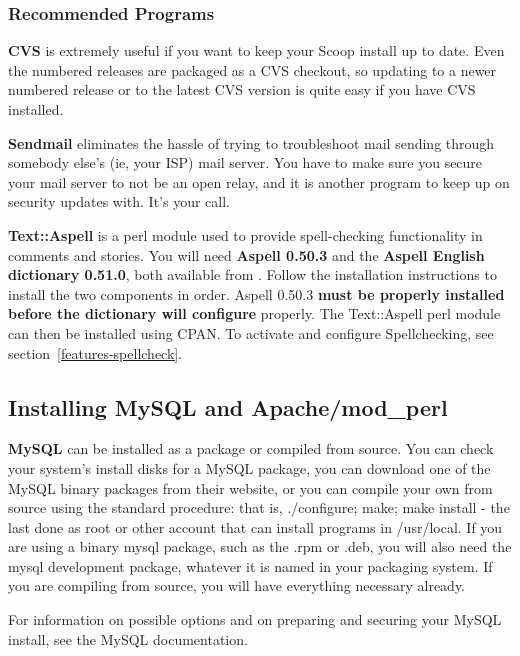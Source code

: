 \subsubsection{Recommended Programs}
\label{install-recommended-programs}

{\bf CVS} is extremely useful if you want to keep your Scoop install up to date.  Even the numbered releases are packaged as a CVS checkout, so updating to a newer numbered release or to the latest CVS version is quite easy if you have CVS installed.

{\bf Sendmail} eliminates the hassle of trying to troubleshoot mail sending through somebody else's (ie, your ISP) mail server.  You have to make sure you secure your mail server to not be an open relay, and it is another program to keep up on security updates with.  It's your call.

{\bf Text::Aspell} is a perl module used to provide spell-checking functionality in comments and stories.  You will need {\bf Aspell 0.50.3} and the {\bf Aspell English dictionary 0.51.0}, both available from .  Follow the installation instructions to install the two components in order.  Aspell 0.50.3 {\bf must be properly installed before the dictionary will configure} properly.  The Text::Aspell perl module can then be installed using CPAN.  To activate and configure Spellchecking, see section~\ref{features-spellcheck}.

\subsection{Installing MySQL and Apache/mod\_perl}
\label{install-apache-modperl}

{\bf MySQL} can be installed as a package or compiled from source.  You can check your system's install disks for a MySQL package, you can download one of the MySQL binary packages from their website, or you can compile your own from source using the standard procedure: that is, ./configure; make; make install - the last done as root or other account that can install programs in /usr/local.  If you are using a binary mysql package, such as the .rpm or .deb, you will also need the mysql development package, whatever it is named in your packaging system.  If you are compiling from source, you will have everything necessary already.

For information on possible options and on preparing and securing your MySQL install, see the MySQL documentation.

